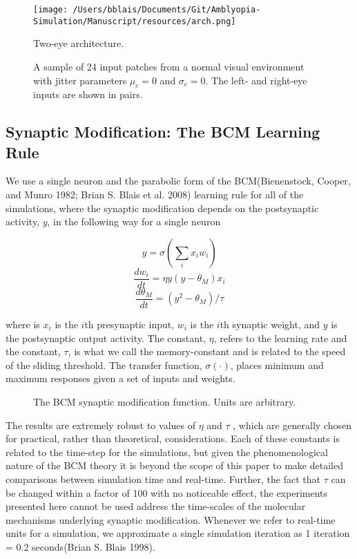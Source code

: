 \documentclass[
  sn-apa,
  pdflatex]{sn-jnl}
\theoremstyle{thmstyleone}%
\theoremstyle{thmstyletwo}%
\theoremstyle{thmstylethree}%
\begin{document}
\begin{figure}
\hypertarget{fig:arch}{%
\centering
\texttt{[image: /Users/bblais/Documents/Git/Amblyopia-Simulation/Manuscript/resources/arch.png]}
\caption{Two-eye architecture.}\label{fig:arch}
}
\end{figure}

\begin{figure}
\hypertarget{fig:normal-inputs}{%
\centering

\caption{A sample of 24 input patches from a normal visual environment
with jitter parameters \(\mu_c=0\) and \(\sigma_c=0\). The left- and
right-eye inputs are shown in pairs.}\label{fig:normal-inputs}
}
\end{figure}

\hypertarget{synaptic-modification-the-bcm-learning-rule}{%
\subsection{Synaptic Modification: The BCM Learning
Rule}\label{synaptic-modification-the-bcm-learning-rule}}

We use a single neuron and the parabolic form of the BCM(Bienenstock,
Cooper, and Munro 1982; Brian S. Blais et al. 2008) learning rule for
all of the simulations, where the synaptic modification depends on the
postsynaptic activity, \(y\), in the following way for a single neuron

\[
y=\sigma\left(\sum_i x_i w_i \right)
\] \[
\frac{dw_i}{dt} = \eta y(y-\theta_M) x_i
\] \[
\frac{d\theta_M}{dt} = (y^2-\theta_M)/\tau
\]

where is \(x_i\) is the \(i\)th presynaptic input, \(w_i\) is the
\(i\)th synaptic weight, and \(y\) is the postsynaptic output activity.
The constant, \(\eta\), refers to the learning rate and the constant,
\(\tau\), is what we call the memory-constant and is related to the
speed of the sliding threshold. The transfer function,
\(\sigma(\cdot)\), places minimum and maximum responses given a set of
inputs and weights.

\begin{figure}
\hypertarget{fig:bcm-phi}{%
\centering

\caption{The BCM synaptic modification function. Units are
arbitrary.}\label{fig:bcm-phi}
}
\end{figure}

The results are extremely robust to values of \(\eta\) and \(\tau\) ,
which are generally chosen for practical, rather than theoretical,
considerations. Each of these constants is related to the time-step for
the simulations, but given the phenomenological nature of the BCM theory
it is beyond the scope of this paper to make detailed comparisons
between simulation time and real-time. Further, the fact that \(\tau\)
can be changed within a factor of 100 with no noticeable effect, the
experiments presented here cannot be used address the time-scales of the
molecular mechanisms underlying synaptic modification. Whenever we refer
to real-time units for a simulation, we approximate a single simulation
iteration as 1 iteration = 0.2 seconds(Brian S. Blais 1998).
\end{document}
